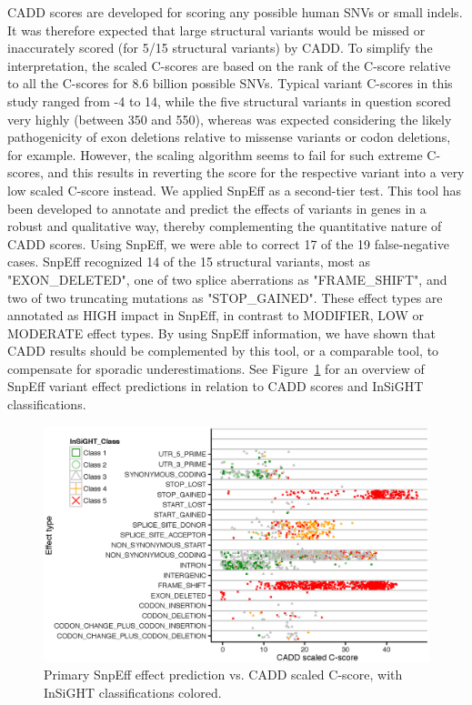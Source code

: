 CADD scores are developed for scoring any possible human SNVs or small indels\cite{Kircher_2014}.
It was therefore expected that large structural variants would be missed or inaccurately scored (for 5/15 structural variants) by CADD.
To simplify the interpretation, the scaled C-scores are based on the rank of the C-score relative to all the C-scores for 8.6 billion possible SNVs.
Typical variant C-scores in this study ranged from -4 to 14, while the five structural variants in question scored very highly (between 350 and 550), whereas was expected considering the likely pathogenicity of exon deletions relative to missense variants or codon deletions, for example.
However, the scaling algorithm seems to fail for such extreme C-scores, and this results in reverting the score for the respective variant into a very low scaled C-score instead.
We applied SnpEff\cite{Cingolani_2012} as a second-tier test.
This tool has been developed to annotate and predict the effects of variants in genes in a robust and qualitative way, thereby complementing the quantitative nature of CADD scores.
Using SnpEff, we were able to correct 17 of the 19 false-negative cases.
SnpEff recognized 14 of the 15 structural variants, most as "EXON\_DELETED", one of two splice aberrations as "FRAME\_SHIFT", and two of two truncating mutations as "STOP\_GAINED".
These effect types are annotated as HIGH impact in SnpEff, in contrast to MODIFIER, LOW or MODERATE effect types.
By using SnpEff information, we have shown that CADD results should be complemented by this tool, or a comparable tool, to compensate for sporadic underestimations.
See Figure~\ref{fig:caddmmr_snpeffvscadd} for an overview of SnpEff variant effect predictions in relation to CADD scores and InSiGHT classifications.

\begin{figure}
\centering
\includegraphics[width=1.0\linewidth]{img/caddmmr_snpeffvscadd}
\caption[SnpEff effect vs. CADD score]{Primary SnpEff effect prediction vs. CADD scaled C-score, with InSiGHT classifications colored.}
\label{fig:caddmmr_snpeffvscadd}
\end{figure}

